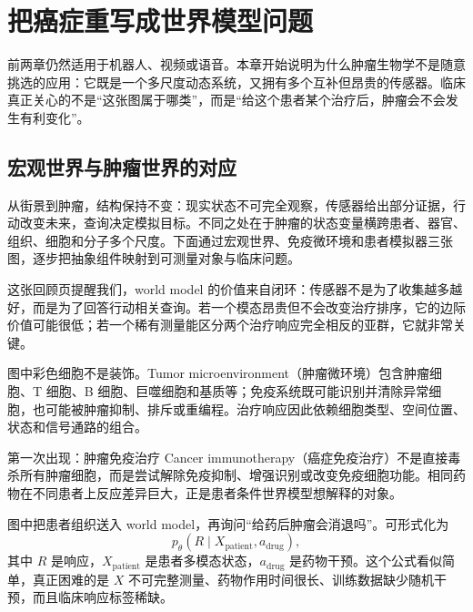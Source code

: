 \section{把癌症重写成世界模型问题}

前两章仍然适用于机器人、视频或语音。本章开始说明为什么肿瘤生物学不是随意挑选的应用：它既是一个多尺度动态系统，又拥有多个互补但昂贵的传感器。临床真正关心的不是“这张图属于哪类”，而是“给这个患者某个治疗后，肿瘤会不会发生有利变化”。

\subsection{宏观世界与肿瘤世界的对应}

从街景到肿瘤，结构保持不变：现实状态不可完全观察，传感器给出部分证据，行动改变未来，查询决定模拟目标。不同之处在于肿瘤的状态变量横跨患者、器官、组织、细胞和分子多个尺度。下面通过宏观世界、免疫微环境和患者模拟器三张图，逐步把抽象组件映射到可测量对象与临床问题。


这张回顾页提醒我们，world model 的价值来自闭环：传感器不是为了收集越多越好，而是为了回答行动相关查询。若一个模态昂贵但不会改变治疗排序，它的边际价值可能很低；若一个稀有测量能区分两个治疗响应完全相反的亚群，它就非常关键。


图中彩色细胞不是装饰。Tumor microenvironment（肿瘤微环境）包含肿瘤细胞、T 细胞、B 细胞、巨噬细胞和基质等；免疫系统既可能识别并清除异常细胞，也可能被肿瘤抑制、排斥或重编程。治疗响应因此依赖细胞类型、空间位置、状态和信号通路的组合。

\begin{knowledgebox}{第一次出现：肿瘤免疫治疗}
Cancer immunotherapy（癌症免疫治疗）不是直接毒杀所有肿瘤细胞，而是尝试解除免疫抑制、增强识别或改变免疫细胞功能。相同药物在不同患者上反应差异巨大，正是患者条件世界模型想解释的对象。
\end{knowledgebox}


图中把患者组织送入 world model，再询问“给药后肿瘤会消退吗”。可形式化为
\[
p_\theta(R\mid X_{\text{patient}},a_{\text{drug}}),
\]
其中 $R$ 是响应，$X_{\text{patient}}$ 是患者多模态状态，$a_{\text{drug}}$ 是药物干预。这个公式看似简单，真正困难的是 $X$ 不可完整测量、药物作用时间很长、训练数据缺少随机干预，而且临床响应标签稀缺。

